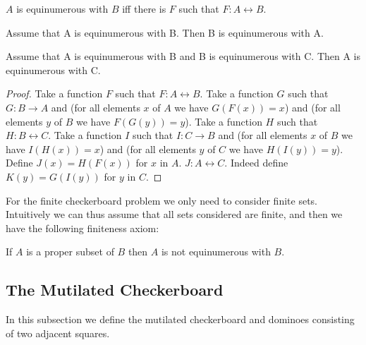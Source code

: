 \begin{forthel}
    \begin{definition}
        $A$ is equinumerous with $B$ iff there is $F$ such that $F : A \leftrightarrow B$.
    \end{definition}

    \begin{lemma}
        Assume that A is equinumerous with B. Then B is equinumerous with A.
    \end{lemma}

    \begin{lemma}
        Assume that A is equinumerous with B and B is equinumerous with C.
        Then A is equinumerous with C.
    \end{lemma}
    \begin{proof}
        Take a function $F$ such that $F : A \leftrightarrow B$.
        Take a function $G$ such that $G : B \to A$ and (for all elements $x$ of $A$ we have $G(F(x)) = x$) and
        (for all elements $y$ of $B$ we have $F(G(y))=y$).
        Take a function $H$ such that $H : B \leftrightarrow C$.
        Take a function $I$ such that $I : C \to B$ and (for all elements $x$ of $B$ we have $I(H(x)) = x$) and
        (for all elements $y$ of $C$ we have $H(I(y))=y$).
        Define $J(x) = H(F(x))$ for $x$ in $A$.
        $J : A \leftrightarrow C$. Indeed define $K(y) = G(I(y))$ for $y$ in $C$.
    \end{proof}
\end{forthel}


For the finite checkerboard problem we only need to consider finite sets.
Intuitively we can thus assume that all sets considered are finite, and then
we have the following finiteness axiom:

\begin{forthel}
    \begin{axiom}
        If $A$ is a proper subset of $B$ then $A$ is not equinumerous with $B$.
    \end{axiom}
\end{forthel}


\subsection{The Mutilated Checkerboard}

In this subsection we define the mutilated checkerboard and dominoes consisting
of two adjacent squares.

